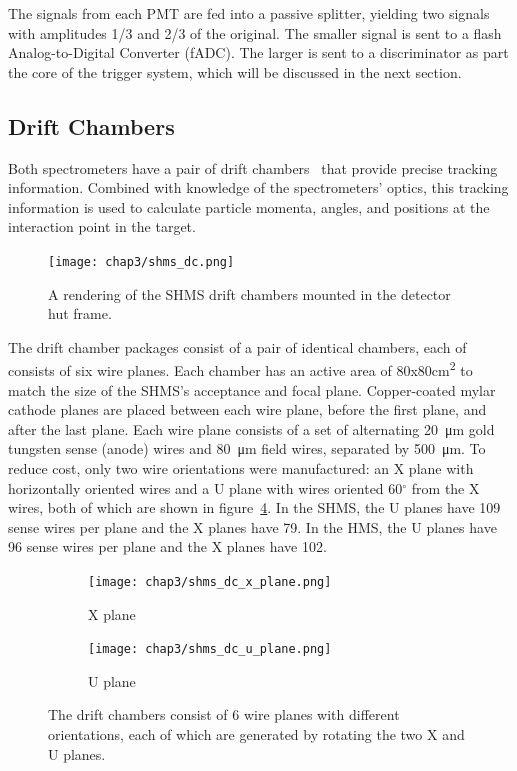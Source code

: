 The signals from each PMT are fed into a passive splitter, yielding two signals
with amplitudes 1/3 and 2/3 of the original.
The smaller signal is sent to a flash Analog-to-Digital Converter (fADC).
The larger is sent to a discriminator as part the core of the trigger system,
which will be discussed in the next section.

\subsection{Drift Chambers}
\label{subsec:drift_chambers}
Both spectrometers have a pair of drift chambers~\cite{SHMS_drift_chambers}
that provide precise tracking information.
Combined with knowledge of the spectrometers' optics, this tracking information
is used to calculate particle momenta, angles, and positions at the interaction
point in the target.

\begin{figure}[!h]
    \centering
    \texttt{[image: chap3/shms\_dc.png]}
    \caption{A rendering  of the SHMS drift chambers mounted in the detector
             hut frame.}
    \label{fig:shms_dc}
\end{figure}

The drift chamber packages consist of a pair of identical chambers, each of
consists of six wire planes.
Each chamber has an active area of 80x80\si{\cm\squared} to match the size of
the SHMS's acceptance and focal plane.
Copper-coated mylar cathode planes are placed between each wire plane, before
the first plane, and after the last plane.
Each wire plane consists of a set of alternating \SI{20}{\micro\meter} gold
tungsten sense (anode) wires and \SI{80}{\micro\meter} field wires, separated
by \SI{500}{\micro\meter}.
To reduce cost, only two wire orientations were manufactured: an X plane with
horizontally oriented wires and a U plane with wires oriented 60$^{\circ}$ from
the X wires, both of which are shown in figure~\ref{fig:dc_planes}.
In the SHMS, the U planes have 109 sense wires per plane and the X planes have
79.
In the HMS, the U planes have 96 sense wires per plane and the X planes have
102.

\begin{figure}[h]
    \centering
    \begin{subfigure}[b]{0.4\textwidth}
        \centering
        \texttt{[image: chap3/shms\_dc\_x\_plane.png]}
        \caption{X plane}
        \label{fig:dc_x_plane}
    \end{subfigure}
    \hfill
    \begin{subfigure}[b]{0.4\textwidth}
        \centering
        \texttt{[image: chap3/shms\_dc\_u\_plane.png]}
        \caption{U plane}
        \label{fig:dc_u_plane}
    \end{subfigure}
    \caption[CAD drawings of the drift chambers.]{The drift chambers consist of 6 wire planes with different
             orientations, each of which are generated by rotating the two
             X and U planes.}
    \label{fig:dc_planes}
\end{figure}

